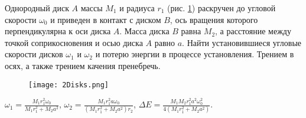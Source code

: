 \begin{ex} %
Однородный диск $A$ массы $M_1$ и радиуса $r_1$ (рис. \ref{2Disks}) раскручен до угловой скорости $\omega_0$ и приведен в контакт с диском $B$, ось вращения которого перпендикулярна к оси диска $A$. Масса диска $B$ равна $M_2$, а расстояние между точкой соприкосновения и осью диска $A$ равно $a$. Найти установившиеся угловые скорости дисков $\omega_1$ и $\omega_2$ и потерю энергии в процессе установления. Трением в осях, а также трением качения пренебречь.

\begin{figure}[h]
\centering
\texttt{[image: 2Disks.png]}
\caption{}
\label{2Disks}
\end{figure}

\begin{ans}
$\omega_1 = \frac{M_1r_1^2\omega_0}{M_1r_1^2 + M_2a^2}$, $\omega_2 = \frac{M_1r_1^2 a \omega_0}{(M_1r_1^2 + M_2a^2)r_2}$, $\Delta E = \frac{M_1 M_2r_1^2a^2\omega_0^2}{4(M_1r_1^2 + M_2a^2)}$.
\end{ans}
\end{ex}	

\clearpage